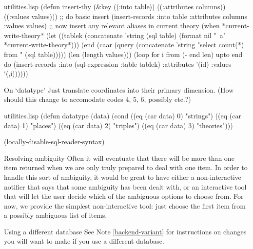 \begin{common}{utilities.lisp}
(defun insert-thy
  (&key ((:into table))
        ((:attributes columns))
        ((:values values)))
  ;; do basic insert
  (insert-records :into table
                  :attributes columns
                  :values values)
  ;; now insert any relevant aliases in current theory
  (when *current-write-theory*
    (let ((tablek (concatenate
                   'string
                   (sql table)
                   (format nil "~a" *current-write-theory*)))
          (end (caar (query (concatenate
                             'string
                             "select count(*) from "
                             (sql table)))))
          (len (length values)))
      (loop for i from (- end len) upto end
            do
            (insert-records :into (sql-expression :table
                                                  tablek)
                            :attributes '(id)
                            :values `(,i))))))
\end{common}

\begin{notate}{On `datatype'}
Just translate coordinates into their primary dimension.
(How should this change to accomodate codes 4, 5, 6,
possibly etc.?)
\end{notate}

\begin{common}{utilities.lisp}
(defun datatype (data)
  (cond ((eq (car data) 0)
         "strings")
        ((eq (car data) 1)
         "places")
        ((eq (car data) 2)
         "triples")
        ((eq (car data) 3)
         "theories")))

(locally-disable-sql-reader-syntax)
\end{common}

\begin{notate}{Resolving ambiguity}
Often it will eventuate that there will be more than one
item returned when we are only truly prepared to deal with
one item.  In order to handle this sort of ambiguity, it
would be great to have either a non-interactive notifier
that says that some ambiguity has been dealt with, or an
interactive tool that will let the user decide which of
the ambiguous options to choose from.  For now, we provide
the simplest non-interactive tool: just choose the first
item from a possibly ambiguous list of items.
\end{notate}

\begin{notate}{Using a different database}
See Note \ref{backend-variant} for instructions on changes
you will want to make if you use a different database.
\end{notate}

